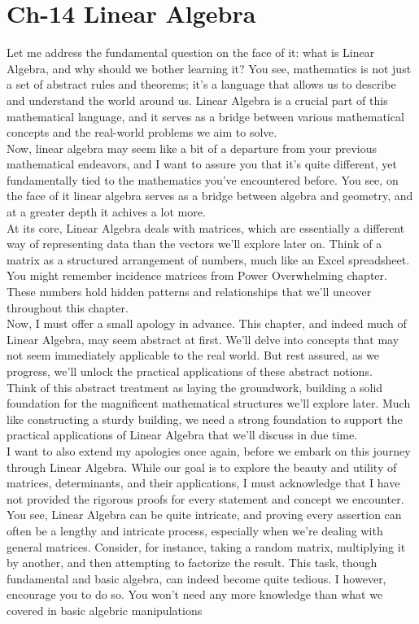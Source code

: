 \chapter{Ch-14 Linear Algebra}
Let me address the fundamental question on the face of it: what is Linear Algebra, and why should we bother learning it? You see, mathematics is not just a set of abstract rules and theorems; it's a language that allows us to describe and understand the world around us. Linear Algebra is a crucial part of this mathematical language, and it serves as a bridge between various mathematical concepts and the real-world problems we aim to solve.\\
Now, linear algebra may seem like a bit of a departure from your previous mathematical endeavors, and I want to assure you that it's quite different, yet fundamentally tied to the mathematics you've encountered before. You see, on the face of it linear algebra serves as a bridge between algebra and geometry, and at a greater depth it achives a lot more.\\
At its core, Linear Algebra deals with matrices, which are essentially a different way of representing data than the vectors we'll explore later on. Think of a matrix as a structured arrangement of numbers, much like an Excel spreadsheet. You might remember incidence matrices from Power Overwhelming chapter. These numbers hold hidden patterns and relationships that we'll uncover throughout this chapter.\\
Now, I must offer a small apology in advance. This chapter, and indeed much of Linear Algebra, may seem abstract at first. We'll delve into concepts that may not seem immediately applicable to the real world. But rest assured, as we progress, we'll unlock the practical applications of these abstract notions. \\
Think of this abstract treatment as laying the groundwork, building a solid foundation for the magnificent mathematical structures we'll explore later. Much like constructing a sturdy building, we need a strong foundation to support the practical applications of Linear Algebra that we'll discuss in due time.\\
I want to also extend my apologies once again, before we embark on this journey through Linear Algebra. While our goal is to explore the beauty and utility of matrices, determinants, and their applications, I must acknowledge that I have not provided the rigorous proofs for every statement and concept we encounter.\\
You see, Linear Algebra can be quite intricate, and proving every assertion can often be a lengthy and intricate process, especially when we're dealing with general matrices. Consider, for instance, taking a random matrix, multiplying it by another, and then attempting to factorize the result. This task, though fundamental and basic algebra, can indeed become quite tedious. I however, encourage you to do so. You won't need any more knowledge than what we covered in basic algebric manipulations\\

